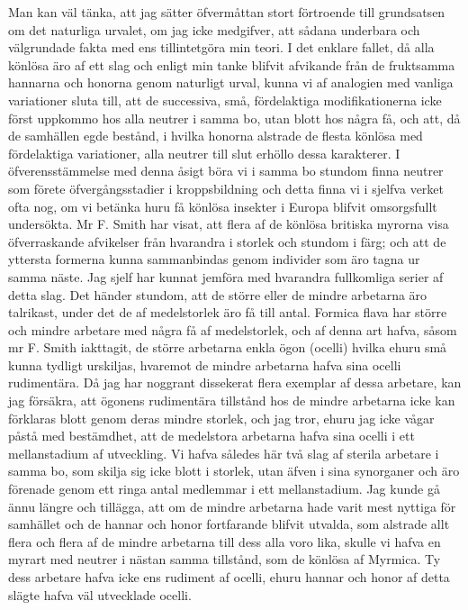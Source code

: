 Man kan väl tänka, att jag sätter öfvermåttan stort förtroende till grundsatsen om det naturliga urvalet, om jag icke medgifver, att sådana underbara och välgrundade fakta med ens tillintetgöra min teori. I det enklare fallet, då alla könlösa äro af ett slag och enligt min tanke blifvit afvikande från de fruktsamma hannarna och honorna genom naturligt urval, kunna vi af analogien med vanliga variationer sluta till, att de successiva, små, fördelaktiga modifikationerna icke först uppkommo hos alla neutrer i samma bo, utan blott hos några få, och att, då de samhällen egde bestånd, i hvilka honorna alstrade de flesta könlösa med fördelaktiga variationer, alla neutrer till slut erhöllo dessa karakterer. I öfverensstämmelse med denna åsigt böra vi i samma bo stundom finna neutrer som förete öfvergångsstadier i kroppsbildning och detta finna vi i sjelfva verket ofta nog, om vi betänka huru få könlösa insekter i Europa blifvit omsorgsfullt undersökta. Mr F. Smith har visat, att flera af de könlösa britiska myrorna visa öfverraskande afvikelser från hvarandra i storlek och stundom i färg; och att de yttersta formerna kunna sammanbindas genom individer som äro tagna ur samma näste. Jag sjelf har kunnat jemföra med hvarandra fullkomliga serier af detta slag. Det händer stundom, att de större eller de mindre arbetarna äro talrikast, under det de af medelstorlek äro få till antal. Formica flava har större och mindre arbetare med några få af medelstorlek, och af denna art hafva, såsom mr F. Smith iakttagit, de större arbetarna enkla ögon (ocelli) hvilka ehuru små kunna tydligt urskiljas, hvaremot de mindre arbetarna hafva sina ocelli rudimentära. Då jag har noggrant dissekerat flera exemplar af dessa arbetare, kan jag försäkra, att ögonens rudimentära tillstånd hos de mindre arbetarna icke kan förklaras blott genom deras mindre storlek, och jag tror, ehuru jag icke vågar påstå med bestämdhet, att de medelstora arbetarna hafva sina ocelli i ett mellanstadium af utveckling. Vi hafva således här två slag af sterila arbetare i samma bo, som skilja sig icke blott i storlek, utan äfven i sina synorganer och äro förenade genom ett ringa antal medlemmar i ett mellanstadium. Jag kunde gå ännu längre och tillägga, att om de mindre arbetarna hade varit mest nyttiga för samhället och de hannar och honor fortfarande blifvit utvalda, som alstrade allt flera och flera af de mindre arbetarna till dess alla voro lika, skulle vi hafva en myrart med neutrer i nästan samma tillstånd, som de könlösa af Myrmica. Ty dess arbetare hafva icke ens rudiment af ocelli, ehuru hannar och honor af detta slägte hafva väl utvecklade ocelli.

